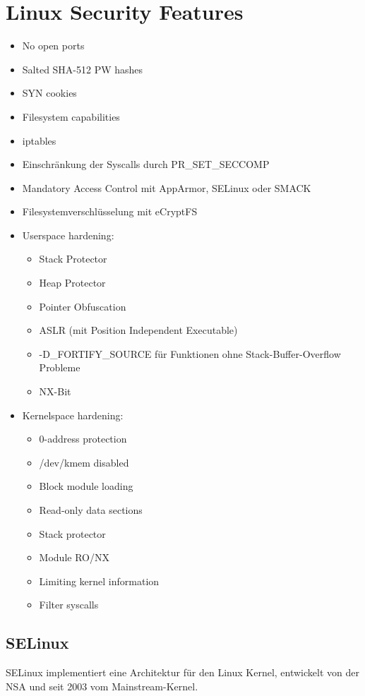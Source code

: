 \section{Linux Security Features}
\begin{itemize}
    \item No open ports
    \item Salted SHA-512 PW hashes
    \item SYN cookies
    \item Filesystem capabilities
    \item iptables
    \item Einschränkung der Syscalls durch PR\_SET\_SECCOMP
    \item Mandatory Access Control mit AppArmor, SELinux oder SMACK
    \item Filesystemverschlüsselung mit eCryptFS
    \item Userspace hardening:
        \begin{itemize}
            \item Stack Protector
            \item Heap Protector
            \item Pointer Obfuscation
            \item ASLR (mit Position Independent Executable)
            \item -D\_FORTIFY\_SOURCE für Funktionen ohne Stack-Buffer-Overflow Probleme
            \item NX-Bit
        \end{itemize}
    \item Kernelspace hardening:
        \begin{itemize}
            \item 0-address protection
            \item /dev/kmem disabled
            \item Block module loading
            \item Read-only data sections
            \item Stack protector
            \item Module RO/NX
            \item Limiting kernel information
            \item Filter syscalls
        \end{itemize}
\end{itemize}

\subsection{SELinux}
SELinux implementiert eine  Architektur für den Linux Kernel,
 entwickelt von der NSA und seit 2003 vom Mainstream-Kernel.

